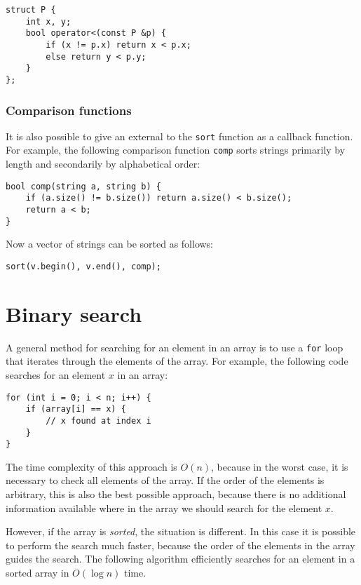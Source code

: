 \begin{lstlisting}
struct P {
    int x, y;
    bool operator<(const P &p) {
        if (x != p.x) return x < p.x;
        else return y < p.y;
    }
};
\end{lstlisting}

\subsubsection{Comparison functions}


It is also possible to give an external
 to the \texttt{sort} function
as a callback function.
For example, the following comparison function \texttt{comp}
sorts strings primarily by length and secondarily
by alphabetical order:

\begin{lstlisting}
bool comp(string a, string b) {
    if (a.size() != b.size()) return a.size() < b.size();
    return a < b;
}
\end{lstlisting}
Now a vector of strings can be sorted as follows:
\begin{lstlisting}
sort(v.begin(), v.end(), comp);
\end{lstlisting}

\section{Binary search}


A general method for searching for an element
in an array is to use a \texttt{for} loop
that iterates through the elements of the array.
For example, the following code searches for
an element $x$ in an array:

\begin{lstlisting}
for (int i = 0; i < n; i++) {
    if (array[i] == x) {
        // x found at index i
    }
}
\end{lstlisting}

The time complexity of this approach is $O(n)$,
because in the worst case, it is necessary to check
all elements of the array.
If the order of the elements is arbitrary,
this is also the best possible approach, because
there is no additional information available where
in the array we should search for the element $x$.

However, if the array is \emph{sorted},
the situation is different.
In this case it is possible to perform the
search much faster, because the order of the
elements in the array guides the search.
The following  algorithm
efficiently searches for an element in a sorted array
in $O(\log n)$ time.

